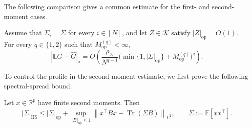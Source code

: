 \documentclass[EJP, preprint, NODS, nobera, nofontexpansion]{ejpecp}
\DeclareMathOperator{\op}{op}
\DeclareMathOperator{\tr}{Tr}
\DeclareMathOperator{\hs}{HS}
\begin{document}
The following comparison gives a common estimate for the first- and
second-moment cases. 






















\begin{proposition}
\label{pro:one_class_sectorial_comparison}
Assume that $\Sigma_i=\Sigma$ for every $i\in[N]$, and let
$Z\in\mathcal K$ satisfy $|Z|_{\op}=O(1)$.
For every $q\in\{1,2\}$ such that $M_{\op}^{(q)}<\infty$,
\begin{equation}
\label{eq:common_sectorial_bias}
    |\mathbb EG-\widehat G|_*
    =
    O\!\left(
        \frac{\rho_\Sigma}{N^{q-1}}
        \bigl(
            \min\{1,|\Sigma|_{\op}\}
            +M_{\op}^{(q)}
        \bigr)^q
    \right).
\end{equation}
\end{proposition}

To control the profile in the second-moment estimate, we first prove
the following spectral-spread bound.

\begin{lemma}
\label{lem:quadratic_form_spectral_spread}
Let $x\in\mathbb R^p$ have finite second moments. Then
\begin{align*}
    |\Sigma|_{\hs} 
    \leq|\Sigma|_{\op}  + \sup_{|B|_{\op}\leq1}
    \left\|x^\top Bx-\tr(\Sigma B)\right\|_{L^2},
    \qquad \Sigma:=\mathbb E[xx^\top].
\end{align*}

\end{lemma}
\end{document}
